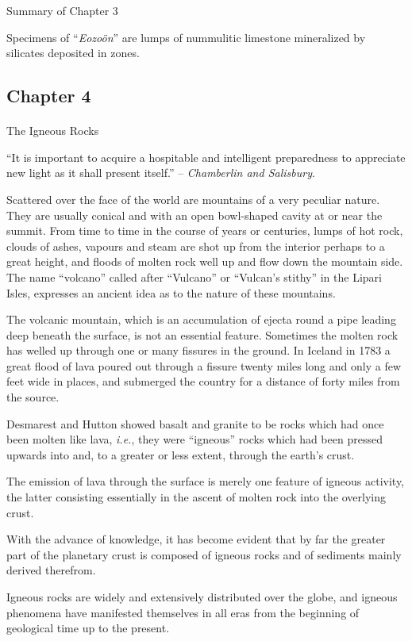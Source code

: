 \documentclass[a4paper, 12pt, oneside]{article}
\begin{document}
Summary of Chapter 3

Specimens of ``\emph{Eozoön}'' are lumps of nummulitic limestone mineralized by silicates deposited in zones.
\clearpage
\subsection{Chapter 4}
\paragraph{}
The Igneous Rocks

``It is important to acquire a hospitable and intelligent preparedness to appreciate new light as it shall present itself.'' -- \emph{Chamberlin and Salisbury}.

Scattered over the face of the world are mountains of a very peculiar nature. They are usually conical and with an open bowl-shaped cavity at or near the summit. From time to time in the course of years or centuries, lumps of hot rock, clouds of ashes, vapours and steam are shot up from the interior perhaps to a great height, and floods of molten rock well up and flow down the mountain side. The name ``volcano'' called after ``Vulcano'' or ``Vulcan's stithy'' in the Lipari Isles, expresses an ancient idea as to the nature of these mountains.

The volcanic mountain, which is an accumulation of ejecta round a pipe leading deep beneath the surface, is not an essential feature. Sometimes the molten rock has welled up through one or many fissures in the ground. In Iceland in 1783 a great flood of lava poured out through a fissure twenty miles long and only a few feet wide in places, and submerged the country for a distance of forty miles from the source.

Desmarest and Hutton showed basalt and granite to be rocks which had once been molten like lava, \emph{i.e.}, they were ``igneous'' rocks which had been pressed upwards into and, to a greater or less extent, through the earth's crust.

The emission of lava through the surface is merely one feature of igneous activity, the latter consisting essentially in the ascent of molten rock into the overlying crust.

With the advance of knowledge, it has become evident that by far the greater part of the planetary crust is composed of igneous rocks and of sediments mainly derived therefrom.

Igneous rocks are widely and extensively distributed over the globe, and igneous phenomena have manifested themselves in all eras from the beginning of geological time up to the present.
\end{document}
